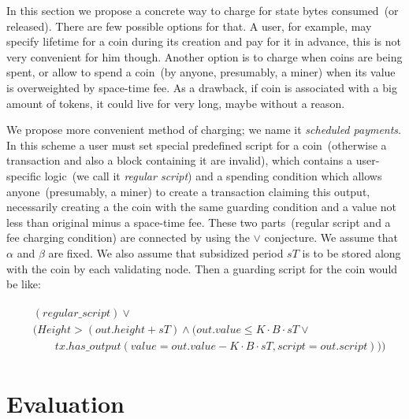 \documentclass[]{llncs}   %
\newcommand{\authnote}[2]{\marginpar{\parbox{\marginparwidth}{\tiny %
  \textsf{#1 {\textcolor{blue}{notes: #2}}}}}%
  \textcolor{blue}{\textbf{\dag}}}
\newcommand{\authnote}[2]{
  \textsf{#1\textcolor{blue}{ #2}}}
\newcommand{\authnote}[2]{}
\newcommand{\knote}[1]{{\authnote{\textcolor{green}{Alex notes:}}{#1}}}
\begin{document}
In this section we propose a concrete way to charge for state bytes consumed~(or released). There are few possible options for that. A user, for example, may specify lifetime for a coin during its creation and pay for it in advance, this is not very convenient for him though. Another option is to charge when coins are being spent, or allow to spend a coin~(by anyone, presumably, a miner) when its value is overweighted by space-time fee. As a drawback, if coin is associated with a big amount of tokens, it could live for very long, maybe without a reason. 

We propose more convenient method of charging; we name it {\em scheduled payments}. In this scheme a user must set special predefined script for a coin~(otherwise a transaction and also a block containing it are invalid), which contains a user-specific logic~(we call it {\em regular script}) and a spending condition which allows anyone~(presumably, a miner) to create a transaction claiming this output, necessarily creating a the coin with the same guarding condition and a value not less than original minus a space-time fee. These two parts~(regular script and a fee charging condition) are connected by using the $\lor$ conjecture. We assume that $\alpha$ and $\beta$ are fixed. We also assume that subsidized period $sT$ is to be stored along with the coin by each validating node. \knote{notation, link to fig. 4}  Then a guarding script for the coin would be like:

\begin{align}
\begin{split}
&(regular\_script) \lor \\
&(Height > (out.height + sT) \land (out.value \le K \cdot B \cdot sT \lor \\  
&\qquad tx.has\_output(value = out.value - K \cdot B \cdot sT, script = out.script)))
\end{split}
\end{align}

\knote{notation: K, B, sT}

\section{Evaluation}




\appendix
\end{document}
